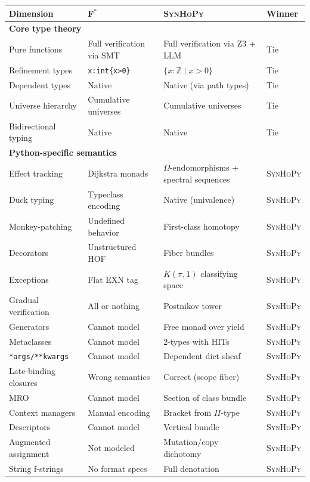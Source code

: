 \documentclass[11pt,a4paper]{report}
\theoremstyle{definition}
\theoremstyle{plain}
\newcommand{\Int}{\mathbb{Z}}
\newcommand{\fstar}{F$^{*}$}
\newcommand{\synhopy}{\textsc{SynHoPy}}
\begin{document}
\begin{longtable}{p{4cm}p{4.5cm}p{4.5cm}p{1.5cm}}
\toprule
\textbf{Dimension} & \textbf{\fstar{}} & \textbf{\synhopy{}} & \textbf{Winner} \\
\midrule
\endhead
\multicolumn{4}{l}{\textbf{Core type theory}} \\
\midrule
Pure functions & Full verification via SMT & Full verification via Z3 + LLM & Tie \\
Refinement types & \lstinline[style=fstar]|x:int{x>0}| & $\{x : \Int \mid x > 0\}$ & Tie \\
Dependent types & Native & Native (via path types) & Tie \\
Universe hierarchy & Cumulative universes & Cumulative universes & Tie \\
Bidirectional typing & Native & Native & Tie \\
\midrule
\multicolumn{4}{l}{\textbf{Python-specific semantics}} \\
\midrule
Effect tracking & Dijkstra monads & $\Omega$-endomorphisms + spectral sequences & \synhopy{} \\
Duck typing & Typeclass encoding & Native (univalence) & \synhopy{} \\
Monkey-patching & Undefined behavior & First-class homotopy & \synhopy{} \\
Decorators & Unstructured HOF & Fiber bundles & \synhopy{} \\
Exceptions & Flat EXN tag & $K(\pi,1)$ classifying space & \synhopy{} \\
Gradual verification & All or nothing & Postnikov tower & \synhopy{} \\
Generators & Cannot model & Free monad over yield & \synhopy{} \\
Metaclasses & Cannot model & 2-types with HITs & \synhopy{} \\
\texttt{*args/**kwargs} & Cannot model & Dependent dict sheaf & \synhopy{} \\
Late-binding closures & Wrong semantics & Correct (scope fiber) & \synhopy{} \\
MRO & Cannot model & Section of class bundle & \synhopy{} \\
Context managers & Manual encoding & Bracket from $\Pi$-type & \synhopy{} \\
Descriptors & Cannot model & Vertical bundle & \synhopy{} \\
Augmented assignment & Not modeled & Mutation/copy dichotomy & \synhopy{} \\
String f-strings & No format specs & Full denotation & \synhopy{} \\

\end{longtable}
\end{document}
